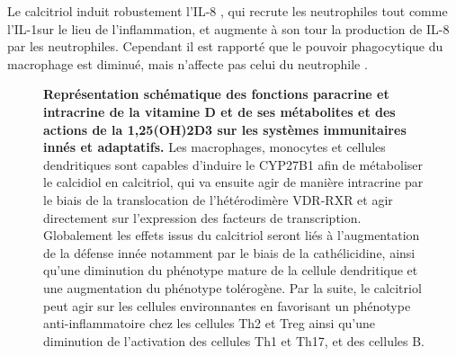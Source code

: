 \documentclass[
  a4paper,
  DIV=11,
  numbers=noendperiod,
  listof=totoc]{scrreprt}
\begin{document}
Le calcitriol induit robustement l'IL-8 \autocite{Bishop.2021}, qui
recrute les neutrophiles tout comme l'IL-1\mupbeta sur le lieu de
l'inflammation, et augmente à son tour la production de IL-8 par les
neutrophiles. Cependant il est rapporté que le pouvoir phagocytique du
macrophage est diminué, mais n'affecte pas celui du neutrophile
\autocite{Chen.2017}.

\begin{figure}


\caption[Représentation schématique des fonctions paracrine et
intracrine de la vitamine D et de ses métabolites et des actions de la
\ac{1,25(OH)2D3} sur les systèmes immunitaires innés et
adaptatifs.]{\label{fig-vd-action}\textbf{Représentation schématique des
fonctions paracrine et intracrine de la vitamine D et de ses métabolites
et des actions de la \ac{1,25(OH)2D3} sur les systèmes immunitaires
innés et adaptatifs.} Les macrophages, monocytes et cellules
dendritiques sont capables d'induire le \ac{CYP27B1} afin de métaboliser
le calcidiol en calcitriol, qui va ensuite agir de manière intracrine
par le biais de la translocation de l'hétérodimère \ac{VDR}-\ac{RXR} et
agir directement sur l'expression des facteurs de transcription.
Globalement les effets issus du calcitriol seront liés à l'augmentation
de la défense innée notamment par le biais de la cathélicidine, ainsi
qu'une diminution du phénotype mature de la cellule dendritique et une
augmentation du phénotype tolérogène. Par la suite, le calcitriol peut
agir sur les cellules environnantes en favorisant un phénotype
anti-inflammatoire chez les cellules \ac{Th2} et \ac{Treg} ainsi qu'une
diminution de l'activation des cellules \ac{Th1} et \ac{Th17}, et des
cellules B. \autocite{Charoenngam.2020}}

\end{figure}%
\end{document}
